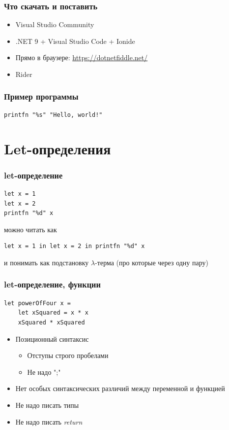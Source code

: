 \documentclass{../../slides-style}
\begin{document}
    \begin{frame}
        \frametitle{Что скачать и поставить}
        \begin{itemize}
            \item Visual Studio Community
            \item .NET 9 + Visual Studio Code + Ionide
            \item Прямо в браузере: \url{https://dotnetfiddle.net/}
            \item Rider
        \end{itemize}
    \end{frame}
    
    \begin{frame}[fragile]
        \frametitle{Пример программы}
        \begin{verbatim}
printfn "%s" "Hello, world!"
        \end{verbatim}
    \end{frame}

    \section{Let-определения}

    \begin{frame}[fragile]
        \frametitle{let-определение}
        \begin{verbatim}
let x = 1
let x = 2
printfn "%d" x
        \end{verbatim}
        можно читать как
        \begin{verbatim}
let x = 1 in let x = 2 in printfn "%d" x
        \end{verbatim}
        и понимать как подстановку $\lambda$-терма (про которые через одну пару)
    \end{frame}

    \begin{frame}[fragile]
        \frametitle{let-определение, функции}
        \begin{verbatim}
let powerOfFour x = 
    let xSquared = x * x
    xSquared * xSquared
        \end{verbatim}
        \begin{itemize}
            \item Позиционный синтаксис
            \begin{itemize}
                \item Отступы строго пробелами
                \item Не надо ";"
            \end{itemize}
            \item Нет особых синтаксических различий между переменной и функцией
            \item Не надо писать типы
            \item Не надо писать \textit{return}
        \end{itemize}
    \end{frame}
\end{document}
